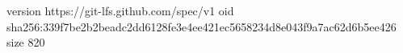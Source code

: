 version https://git-lfs.github.com/spec/v1
oid sha256:339f7be2b2beadc2dd6128fe3e4ee421ec5658234d8e043f9a7ac62d6b5ee426
size 820
